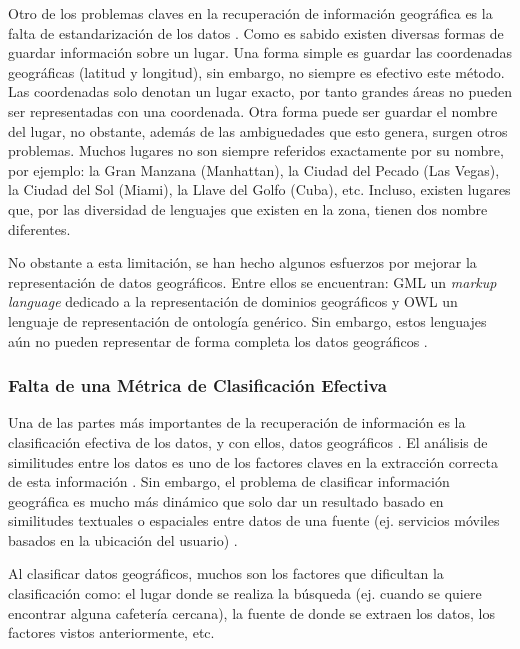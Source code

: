 \documentclass{llncs}
\begin{document}
Otro de los problemas claves en la recuperación de información geográfica es la
falta de estandarización de los datos \cite{deAndrade2014}. Como es sabido
existen diversas formas de guardar información sobre un lugar. Una forma simple
es guardar las coordenadas geográficas (latitud y longitud), sin
embargo, no siempre es efectivo este método. Las coordenadas solo denotan un
lugar exacto, por tanto grandes áreas no pueden ser representadas con una
coordenada. Otra forma puede ser guardar el nombre del lugar, no obstante,
además de las ambiguedades que esto genera, surgen otros problemas. Muchos
lugares no son siempre referidos exactamente por su nombre, por ejemplo: la
Gran Manzana (Manhattan), la Ciudad del Pecado (Las Vegas), la Ciudad del Sol
(Miami), la Llave del Golfo (Cuba), etc. Incluso, existen lugares que, por las
diversidad de lenguajes que existen en la zona, tienen dos nombre diferentes.

No obstante a esta limitación, se han hecho algunos esfuerzos por mejorar la
representación de datos geográficos. Entre ellos se encuentran: GML un
\emph{markup language} dedicado a la representación de dominios geográficos y
OWL un lenguaje de representación de ontología genérico. Sin embargo, estos
lenguajes aún no pueden representar de forma completa los datos geográficos
\cite{abdelmoty2005}.

\subsubsection{Falta de una Métrica de Clasificación Efectiva}\label{sec:metric}

Una de las partes más importantes de la recuperación de información es la
clasificación efectiva de los datos, y con ellos, datos geográficos
\cite{purves2004,mandl2008,cai2011}. El análisis de similitudes entre los datos
es uno de los factores claves en la extracción correcta de esta información
\cite{janowicz2011}. Sin embargo, el problema de clasificar información
geográfica es mucho más dinámico que solo dar un resultado basado en
similitudes textuales o espaciales entre datos de una fuente (ej. servicios
móviles basados en la ubicación del usuario) \cite{kumar2011}.

Al clasificar datos geográficos, muchos son los factores que dificultan la
clasificación como: el lugar donde se realiza la búsqueda (ej. cuando se quiere
encontrar alguna cafetería cercana), la fuente de donde se extraen los datos,
los factores vistos anteriormente, etc.
\end{document}
